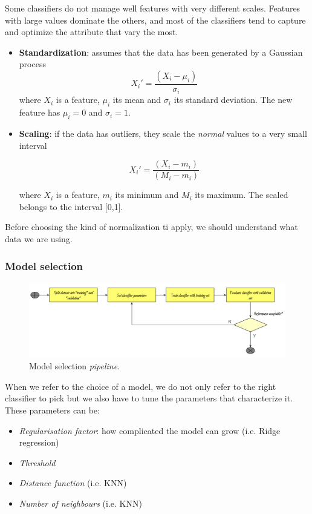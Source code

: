 Some classifiers do not manage well features with very different scales. Features with large values dominate the others, and most of the classifiers tend to capture and optimize the attribute that vary the most.

\begin{itemize}
\item \textbf{Standardization}: assumes that the data has been generated by a Gaussian process 
$$X_i' = \frac{(X_i - \mu_i)}{\sigma_i}$$
where $X_i$ is a feature, $\mu_i$ its mean and $\sigma_i$ its standard deviation. The new feature has $\mu_i = 0$ and $\sigma_i = 1$.

\item \textbf{Scaling}: if the data has outliers, they scale the \emph{normal} values to a very small interval

$$X_i' = \frac{(X_i - m_i)}{(M_i - m_i)}$$

where $X_i$ is a feature, $m_i$ its minimum and $M_i$ its maximum. The scaled belongs to the interval [0,1].

\end{itemize}

Before choosing the kind of normalization ti apply, we should understand what data we are using.

\subsubsection{Model selection}

\begin{figure}[H]%
 \centering
 \includegraphics[width=13cm]{./img/08/model_selection}
 \caption{\label{pic:model_selection} Model selection \emph{pipeline}.}
\end{figure}

When we refer to the choice of a model, we do not only refer to the right classifier to pick but we also have to tune the parameters that characterize it. These parameters can be:
\begin{itemize}
\item \emph{Regularisation factor}: how complicated the model can grow (i.e. Ridge regression)
\item \emph{Threshold} 
\item \emph{Distance function} (i.e. KNN)
\item \emph{Number of neighbours} (i.e. KNN)
\end{itemize}

